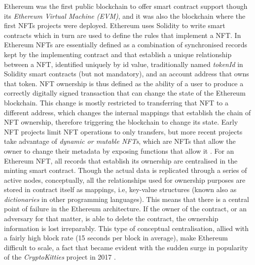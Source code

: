 \documentclass[../main.tex]{subfiles}
\begin{document}
Ethereum was the first public blockchain to offer smart contract support though its \textit{Ethereum Virtual Machine (EVM)}, and it was also the blockchain where the first NFTs projects were deployed. Ethereum uses Solidity to write smart contracts which in turn are used to define the rules that implement a NFT. In Ethereum NFTs are essentially defined as a combination of synchronised records kept by the implementing contract and that establish a unique relationship between a NFT, identified uniquely by id value, traditionally named \textit{tokenId} in Solidity smart contracts (but not mandatory), and an account address that owns that token. NFT ownership is thus defined as the ability of a user to produce a correctly digitally signed transaction that can change the state of the Ethereum blockchain. This change is mostly restricted to transferring that NFT to a different address, which changes the internal mappings that establish the chain of NFT ownership, therefore triggering the blockchain to change its state. Early NFT projects limit NFT operations to only transfers, but more recent projects take advantage of \textit{dynamic or mutable NFTs}, which are NFTs that allow the owner to change their metadata by exposing functions that allow it \cite{Guidi2023}. For an Ethereum NFT, all records that establish its ownership are centralised in the minting smart contract. Though the actual data is replicated through a series of active nodes, conceptually, all the relationships used for ownership purposes are stored in contract itself as mappings, i.e, key-value structures (known also as \textit{dictionaries} in other programming languages). This means that there is a central point of failure in the Ethereum architecture. If the owner of the contract, or an adversary for that matter, is able to delete the contract, the ownership information is lost irreparably. This type of conceptual centralisation, allied with a fairly high block rate (15 seconds per block in average), make Ethereum difficult to scale, a fact that became evident with the sudden surge in popularity of the \textit{CryptoKitties} project in 2017 \cite{bbc2017}.
\end{document}

